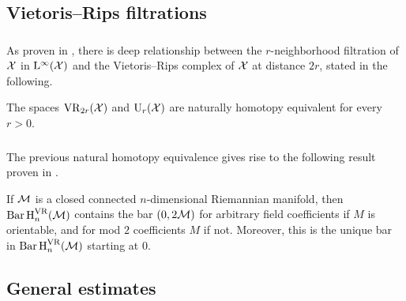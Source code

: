 
%


\subsection{Vietoris--Rips filtrations}

\subsubsection{}\label{ss:kuratowski_vr}

As proven in \cite[Thm.~4.1]{lim2020vietoris}, there is deep relationship between the \(r\)-neighborhood filtration of $\mathcal{X}$ in $\mathrm{L}^\infty(\mathcal{X})$ and the Vietoris--Rips complex of \(\mathcal{X}\) at distance \(2r\), stated in the following.

\medskip\lemma The spaces $\mathrm{VR}_{2r}(\mathcal{X})$ and $\mathrm{U}_r(\mathcal{X})$ are naturally homotopy equivalent for every \(r > 0\).

\subsubsection{}

The previous natural homotopy equivalence gives rise to the following result proven in \cite[Prop.~9.28]{lim2020vietoris}.

\medskip\lemma
If $\mathcal{M}$ is a closed connected $n$-dimensional Riemannian manifold, then \(\operatorname{Bar} \operatorname{H}_{n}^{\mathrm{VR}} (\mathcal{M})\) contains the bar \((0,2{\mathcal{M}})\) for arbitrary field coefficients if $M$ is orientable, and for mod $2$ coefficients $M$ if not.
Moreover, this is the unique bar in \(\operatorname{Bar} \operatorname{H}_{n}^{\mathrm{VR}} (\mathcal{M})\) starting at $0$.


\subsection{General estimates}\label{ss:barcode_general}

